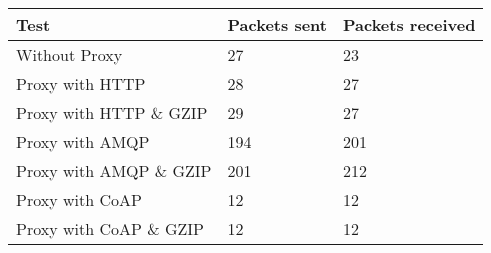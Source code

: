 \begin{tabular}{|l|l|l|}
\hline
\textbf{Test} & \textbf{Packets sent} & \textbf{Packets received} \\ \hline
Without Proxy                    &27         & 23        \\ \hline 
Proxy with HTTP                  &28         & 27        \\ \hline 
Proxy with HTTP \& GZIP          &29         & 27        \\ \hline 
Proxy with AMQP                  &194        & 201       \\ \hline 
Proxy with AMQP \& GZIP          &201        & 212       \\ \hline 
Proxy with CoAP                  &12         & 12        \\ \hline 
Proxy with CoAP \& GZIP          &12         & 12        \\ \hline 
\end{tabular}